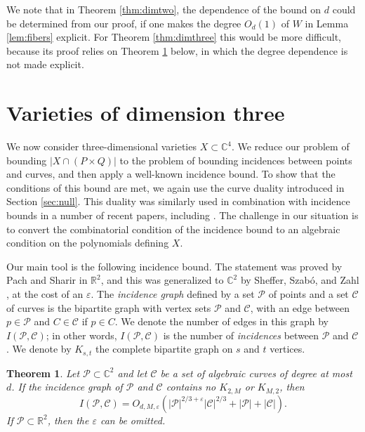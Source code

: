 \documentclass{daj}
\newtheorem{theorem}{Theorem}[section]
\theoremstyle{definition}
\newcommand{\C}{\mathbb C}
\newcommand{\R}{\mathbb R}
\newcommand{\pts}{\mathcal P}
\newcommand{\cvs}{\mathcal C}
\newcommand{\eps}{\varepsilon}
\begin{document}
We note that in Theorem \ref{thm:dimtwo}, the dependence of the bound on $d$ could be determined from our proof, if one makes the degree $O_d(1)$ of $W$ in Lemma \ref{lem:fibers} explicit.
For Theorem \ref{thm:dimthree} this would be more difficult, because its proof relies on Theorem \ref{thm:shefferzahl} below, in which the degree dependence is not made explicit.



\section{Varieties of dimension three}
\label{sec:dimthree}

We now consider three-dimensional varieties $X\subset \C^4$.
We reduce our problem of bounding $|X\cap (P\times Q)|$ to the problem of bounding incidences between points and curves, and then apply a well-known incidence bound.
To show that the conditions of this bound are met, we again use the curve duality introduced in Section \ref{sec:null}.
This duality was similarly used in combination with incidence bounds in a number of recent papers, including \cite{PZ, RSZ, SSS}.
The challenge in our situation is to convert the combinatorial condition of the incidence bound to an algebraic condition on the polynomials defining $X$.


Our main tool is the following incidence bound.
The statement was proved by Pach and Sharir \cite{PS} in $\R^2$, and this was generalized to $\C^2$ by Sheffer, Szab\'o, and Zahl \cite{SSZ}, at the cost of an $\eps$.
The \emph{incidence graph} defined by a set $\pts$ of points and a set $\cvs$ of curves is the bipartite graph with vertex sets $\pts$ and $\cvs$, with an edge between $p\in \pts$ and $C\in \cvs$ if $p\in C$.
We denote the number of edges in this graph by $I(\pts,\cvs)$; in other words, $I(\pts,\cvs)$ is the number of \emph{incidences} between $\pts$ and $\cvs$.
We denote by $K_{s,t}$ the complete bipartite graph on $s$ and $t$ vertices.


\begin{theorem}
\label{thm:shefferzahl}
Let $\pts\subset \C^2$ and let $\mathcal{C}$ be a set of algebraic curves of degree at most $d$.
If the incidence graph of $ \pts$ and $ \mathcal{C}$ contains no $K_{2,M}$ or $K_{M,2}$,
then
\[I(\pts,\mathcal{C}) = O_{d,M,\eps}\left(|\pts|^{2/3+\eps}|\mathcal{C}|^{2/3}+|\pts|+|\mathcal{C}|\right).\]
If $\pts\subset \R^2$, then the $\eps$ can be omitted.
\end{theorem}
\end{document}
